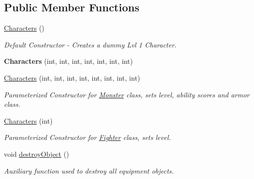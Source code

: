 \subsection*{Public Member Functions}
\begin{DoxyCompactItemize}
\item 
\hypertarget{class_characters_af131b231e05a7960369289684c89afad}{}\label{class_characters_af131b231e05a7960369289684c89afad} 
\hyperlink{class_characters_af131b231e05a7960369289684c89afad}{Characters} ()
\begin{DoxyCompactList}\small\item\em Default Constructor -\/ Creates a dummy Lvl 1 Character. \end{DoxyCompactList}\item 
\hypertarget{class_characters_a06862b46e26e981dad4c1dd3cb286c65}{}\label{class_characters_a06862b46e26e981dad4c1dd3cb286c65} 
{\bfseries Characters} (int, int, int, int, int, int, int)
\item 
\hypertarget{class_characters_aa8fd7da53eaf45404aa9a8e35885da43}{}\label{class_characters_aa8fd7da53eaf45404aa9a8e35885da43} 
\hyperlink{class_characters_aa8fd7da53eaf45404aa9a8e35885da43}{Characters} (int, int, int, int, int, int, int, int)
\begin{DoxyCompactList}\small\item\em Parameterized Constructor for \hyperlink{class_monster}{Monster} class, sets level, ability scores and armor class. \end{DoxyCompactList}\item 
\hypertarget{class_characters_a982bd095e88521e33817bc3ac4eb9607}{}\label{class_characters_a982bd095e88521e33817bc3ac4eb9607} 
\hyperlink{class_characters_a982bd095e88521e33817bc3ac4eb9607}{Characters} (int)
\begin{DoxyCompactList}\small\item\em Parameterized Constructor for \hyperlink{class_fighter}{Fighter} class, sets level. \end{DoxyCompactList}\item 
\hypertarget{class_characters_a6ec320af5d1526eed47070bca6e4d847}{}\label{class_characters_a6ec320af5d1526eed47070bca6e4d847} 
void \hyperlink{class_characters_a6ec320af5d1526eed47070bca6e4d847}{destroy\+Object} ()
\begin{DoxyCompactList}\small\item\em Auxiliary function used to destroy all equipment objects. \end{DoxyCompactList}\item 

\end{DoxyCompactItemize}
